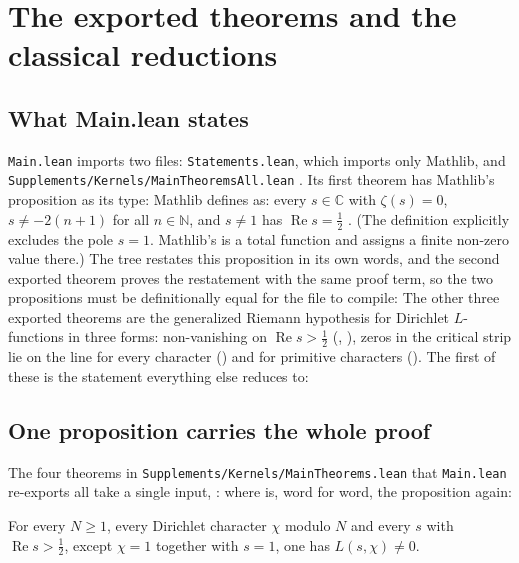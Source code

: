 \section{The exported theorems and the classical reductions}\label{sec:top}

\subsection{What Main.lean states}

\texttt{Main.lean} imports two files: \texttt{Statements.lean}, which imports only Mathlib, and
\nolinkurl{Supplements/Kernels/MainTheoremsAll.lean} . Its first theorem has
Mathlib's proposition as its type:
\noindent Mathlib defines  as: every $s\in\mathbb C$ with $\zeta(s)=0$,
$s\ne-2(n+1)$ for all $n\in\mathbb N$, and $s\ne1$ has $\operatorname{Re}s=\tfrac12$
. (The definition explicitly excludes the pole $s=1$. Mathlib's
 is a total function and assigns a finite non-zero value there.) The tree restates this proposition in its
own words, and the second exported theorem proves the restatement with the same proof term, so the
two propositions must be definitionally equal for the file to compile:
\noindent The other three exported theorems are the generalized Riemann hypothesis for Dirichlet
$L$-functions in three forms: non-vanishing on $\operatorname{Re}s>\frac12$ (,
), zeros in the critical strip lie on the line for every character
() and for primitive characters (). The first
of these is the statement everything else reduces to:

\subsection{One proposition carries the whole proof}

The four theorems in \texttt{Supplements/Kernels/MainTheorems.lean} that \texttt{Main.lean} re-exports
all take a single input, :
\noindent where  is, word for word, the proposition
 again:

\begin{statement}\label{st:every}
For every $N\ge1$, every Dirichlet character $\chi$ modulo $N$ and every $s$ with
$\operatorname{Re}s>\frac12$, except $\chi=1$ together with $s=1$, one has $L(s,\chi)\neq0$.
\end{statement}

